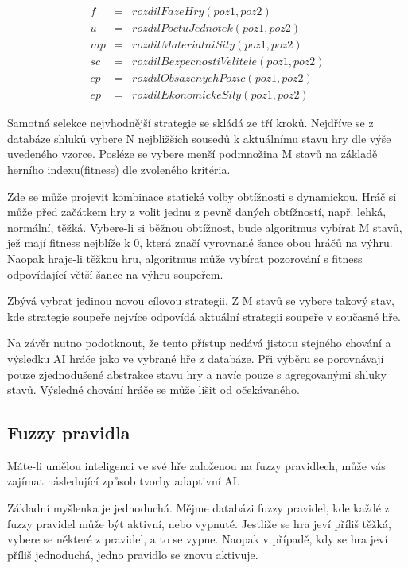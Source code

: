 \begin{eqnarray*}
f &= &rozdilFazeHry(poz1,poz2) \\
u &= &rozdilPoctuJednotek(poz1,poz2) \\
mp &= &rozdilMaterialniSily(poz1,poz2) \\
sc &= &rozdilBezpecnostiVelitele(poz1,poz2) \\
cp &= &rozdilObsazenychPozic(poz1,poz2) \\
ep &= &rozdilEkonomickeSily(poz1,poz2)
\end{eqnarray*}

Samotná selekce nejvhodnější strategie se skládá ze tří kroků. Nejdříve se z databáze shluků vybere N nejbližších sousedů k aktuálnímu stavu hry dle výše uvedeného vzorce. Posléze se vybere menší podmnožina M stavů na základě herního indexu(fitness) dle zvoleného kritéria.

Zde se může projevit kombinace statické volby obtížnosti s dynamickou. Hráč si může před začátkem hry z volit jednu z pevně daných obtížností, např. lehká, normální, těžká. Vybere-li si běžnou obtížnost, bude algoritmus vybírat M stavů, jež mají fitness nejblíže k 0, která značí vyrovnané šance obou hráčů na výhru. Naopak hraje-li těžkou hru, algoritmus může vybírat pozorování s fitness odpovídající větší šance na výhru soupeřem.

Zbývá vybrat jedinou novou cílovou strategii. Z M stavů se vybere takový stav, kde strategie soupeře nejvíce odpovídá aktuální strategii soupeře v současné hře.

Na závěr nutno podotknout, že tento přístup nedává jistotu stejného chování a výsledku AI hráče jako ve vybrané hře z databáze. Při výběru se porovnávají pouze zjednodušené abstrakce stavu hry a navíc pouze s agregovanými shluky stavů. Výsledné chování hráče se může lišit od očekávaného.


\subsection{Fuzzy pravidla}

Máte-li umělou inteligenci ve své hře založenou na fuzzy pravidlech, může vás zajímat následující způsob tvorby adaptivní AI.

Základní myšlenka je jednoduchá. Mějme databázi fuzzy pravidel, kde každé z fuzzy pravidel může být aktivní, nebo vypnuté. Jestliže se hra jeví příliš těžká, vybere se některé z pravidel, a to se vypne. Naopak v případě, kdy se hra jeví příliš jednoduchá, jedno pravidlo se znovu aktivuje.

